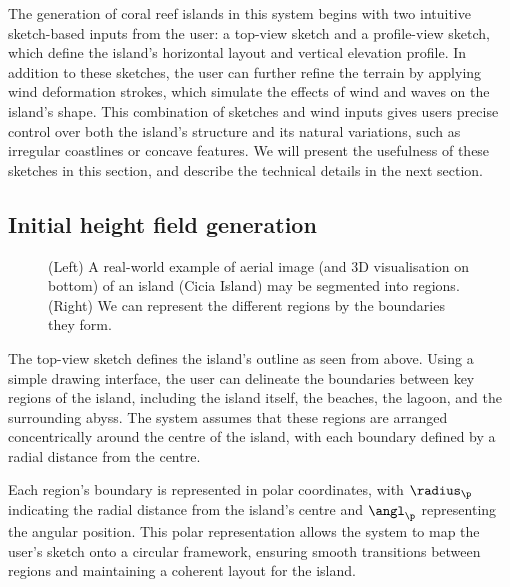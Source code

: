 
The generation of coral reef islands in this system begins with two intuitive sketch-based inputs from the user: a top-view sketch and a profile-view sketch, which define the island's horizontal layout and vertical elevation profile. In addition to these sketches, the user can further refine the terrain by applying wind deformation strokes, which simulate the effects of wind and waves on the island's shape. This combination of sketches and wind inputs gives users precise control over both the island's structure and its natural variations, such as irregular coastlines or concave features. We will present the usefulness of these sketches in this section, and describe the technical details in the next section.

\subsection{Initial height field generation}
\label{sec:coral-island-generation-initial}

\begin{figure}[H]
\centering
{}
\caption{(Left) A real-world example of aerial image (and 3D visualisation on bottom) of an island (Cicia Island) may be segmented into regions. (Right) We can represent the different regions by the boundaries they form.}
\label{fig:coral-island-top-view-sketch}
\end{figure}

The top-view sketch defines the island's outline as seen from above. Using a simple drawing interface, the user can delineate the boundaries between key regions of the island, including the island itself, the beaches, the lagoon, and the surrounding abyss. The system assumes that these regions are arranged concentrically around the centre of the island, with each boundary defined by a radial distance from the centre.

Each region's boundary is represented in polar coordinates, with $\radius_\p$ indicating the radial distance from the island's centre and $\angl_\p$ representing the angular position. This polar representation allows the system to map the user's sketch onto a circular framework, ensuring smooth transitions between regions and maintaining a coherent layout for the island.

